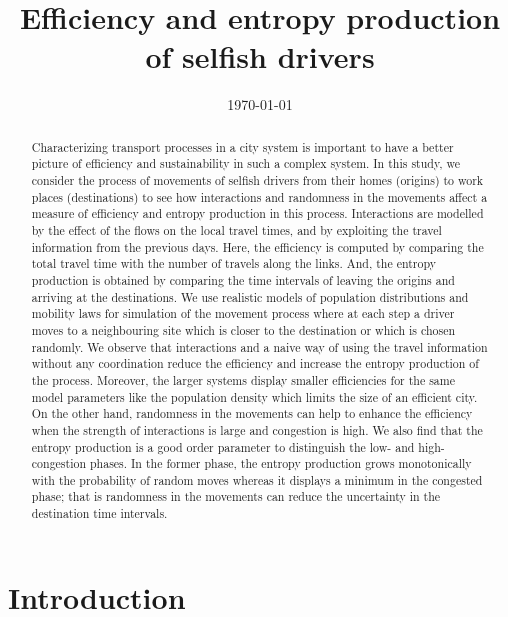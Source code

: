 \documentclass[aps,preprint]{revtex4-1}
\begin{document}
\title{Efficiency and entropy production of selfish drivers}



\date{\today}

\begin{abstract}
Characterizing transport processes in a city system is important to have a better picture of efficiency and sustainability in such a complex system. In this study, we consider the process of movements of selfish drivers from their homes (origins) to work places (destinations) to see how interactions and randomness in the movements affect a measure of efficiency and entropy production in this process. Interactions are modelled by the effect of the flows on the local travel times, and by exploiting the travel information from the previous days. Here, the efficiency is computed by comparing the total travel time with the number of travels along the links. And, the entropy production is obtained by comparing the time intervals of leaving the origins and arriving at the destinations. We use  realistic models of population distributions and mobility laws for simulation of the movement process where at each step a driver moves to a neighbouring site which is closer to the destination or which is chosen randomly. We observe that interactions and a naive way of using the travel information without any coordination reduce the efficiency and increase the entropy production of the process. Moreover, the larger systems display smaller efficiencies for the same model parameters like the population density which limits the size of an efficient city. On the other hand, randomness in the movements can help to enhance the efficiency when the strength of interactions is large and congestion is high. We also find that the entropy production is a good order parameter to distinguish the low- and high-congestion phases. In the former phase, the entropy production grows monotonically with the probability of random moves whereas it displays a minimum in the congested phase; that is randomness in the movements can reduce the uncertainty in the destination time intervals. 
\end{abstract}



\maketitle

\section{Introduction}\label{S0}
\end{document}
